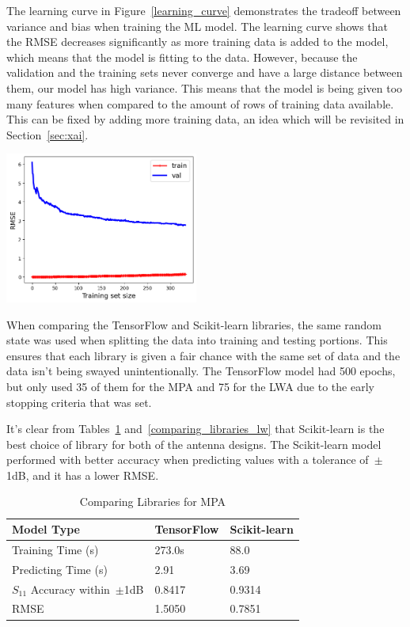 \documentclass[conference]{IEEEtran}
\newenvironment{Figure}
    {\par\medskip\noindent\minipage{\linewidth}}
    {\endminipage\par\medskip}
\begin{document}
The learning curve in Figure~\ref{learning_curve} demonstrates the tradeoff between variance and bias when training the ML model. The learning curve shows that the RMSE decreases significantly as more training data is added to the model, which means that the model is fitting to the data. However, because the validation and the training sets never converge and have a large distance between them, our model has high variance. This means that the model is being given too many features when compared to the amount of rows of training data available. This can be fixed by adding more training data, an idea which will be revisited in Section~\ref{sec:xai}.

\begin{Figure}
    \centering
    \includegraphics[width=2.5in]{images/learningcurve1.png}
    \label{learning_curve}
\end{Figure}


When comparing the TensorFlow and Scikit-learn libraries, the same random state was used when splitting the data into training and testing portions. This ensures that each library is given a fair chance with the same set of data and the data isn't being swayed unintentionally. The TensorFlow model had 500 epochs, but only used 35 of them for the MPA and 75 for the LWA due to the early stopping criteria that was set. 

It's clear from Tables~\ref{comparing_libraries_p} and~\ref{comparing_libraries_lw} that Scikit-learn is the best choice of library for both of the antenna designs. The Scikit-learn model performed with better accuracy when predicting values with a tolerance of~$\pm$1dB, and it has a lower RMSE.

\begin{table}[h]
\caption{Comparing Libraries for MPA}
\begin{center}
\begin{tabular}{ |l|l|l| }
    \hline
    Model Type & TensorFlow & Scikit-learn \\ 
    \hline
    Training Time (s) & 273.0s & 88.0 \\  
    \hline
    Predicting Time (s) & 2.91 & 3.69 \\
    \hline
    $S_{11}$ Accuracy within~$\pm$1dB & 0.8417 & 0.9314 \\
    \hline
    RMSE & 1.5050 & 0.7851 \\
    \hline
\end{tabular}
\end{center}
\label{comparing_libraries_p}
\end{table}
\end{document}
